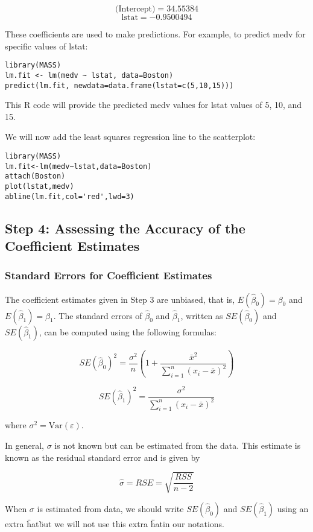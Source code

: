 \documentclass[11pt]{article}
\begin{document}
\[ \text{(Intercept)} = 34.55384 \]
\[ \text{lstat} = -0.9500494 \]

These coefficients are used to make predictions. For example, to predict medv for specific values of lstat:

\begin{verbatim}
library(MASS)
lm.fit <- lm(medv ~ lstat, data=Boston)
predict(lm.fit, newdata=data.frame(lstat=c(5,10,15)))
\end{verbatim}

This R code will provide the predicted medv values for lstat values of 5, 10, and 15.

We will now add the least squares regression line to the scatterplot:

\begin{verbatim}
library(MASS)
lm.fit<-lm(medv~lstat,data=Boston)
attach(Boston)
plot(lstat,medv)
abline(lm.fit,col='red',lwd=3)
\end{verbatim}

\subsection{Step 4: Assessing the Accuracy of the Coefficient Estimates}
\subsubsection{Standard Errors for Coefficient Estimates}

The coefficient estimates given in Step 3 are unbiased, that is, \( E(\hat{\beta}_0) = \beta_0\) and \(E(\hat{\beta}_1) = \beta_1\). The standard errors of \(\hat{\beta}_0\) and \(\hat{\beta}_1\), written as \(SE(\hat{\beta}_0)\) and \(SE(\hat{\beta}_1)\), can be computed using the following formulas:

\[SE(\hat{\beta}_0)^2 = \frac{\sigma^2}{n} \left( 1 + \frac{\bar{x}^2}{\sum_{i=1}^{n} (x_i - \bar{x})^2} \right)\]

\[SE(\hat{\beta}_1)^2 = \frac{\sigma^2}{\sum_{i=1}^{n} (x_i - \bar{x})^2}\]

where \(\sigma^2 = \text{Var}(\varepsilon)\).

In general, \(\sigma\) is not known but can be estimated from the data. This estimate is known as the residual standard error and is given by

\[\hat{\sigma} = RSE = \sqrt{\frac{RSS}{n - 2}}\]

When \(\sigma\) is estimated from data, we should write \(SE(\hat{\beta}_0)\) and \(SE(\hat{\beta}_1)\) using an extra \"hat\" but we will not use this extra \"hat\" in our notations.
\end{document}

